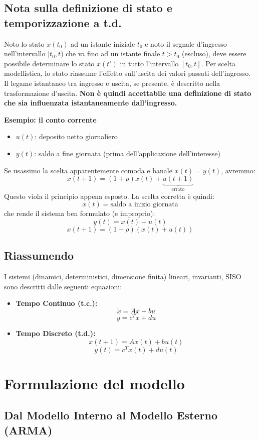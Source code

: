 \documentclass[11pt,a4paper]{article}
\begin{document}
\subsection{Nota sulla definizione di stato e temporizzazione a t.d.}
Noto lo stato $x(t_0)$ ad un istante iniziale $t_0$ e noto il segnale d'ingresso nell'intervallo $[t_0, t)$ che va fino ad un istante finale $t > t_0$ (escluso), deve essere possibile determinare lo stato $x(t')$ in tutto l'intervallo $[t_0, t]$.
Per scelta modellistica, lo stato riassume l'effetto sull'uscita dei valori passati dell'ingresso. Il legame istantaneo tra ingresso e uscita, se presente, è descritto nella trasformazione d'uscita.
\textbf{Non è quindi accettabile una definizione di stato che sia influenzata istantaneamente dall'ingresso.}

\textbf{Esempio: il conto corrente}
\begin{itemize}
    \item $u(t)$: deposito netto giornaliero
    \item $y(t)$: saldo a fine giornata (prima dell'applicazione dell'interesse)
\end{itemize}
Se usassimo la scelta apparentemente comoda e banale $x(t) = y(t)$, avremmo:
$$ x(t+1) = (1+\rho)x(t) + \underbrace{u(t+1)}_{\text{errato}} $$
Questo vìola il principio appena esposto. La scelta corretta è quindi:
$$ x(t) = \text{saldo a inizio giornata} $$
che rende il sistema ben formulato (e improprio):
$$ y(t) = x(t) + u(t) $$
$$ x(t+1) = (1+\rho)(x(t) + u(t)) $$

\subsection{Riassumendo}
I sistemi (dinamici, deterministici, dimensione finita) lineari, invarianti, SISO sono descritti dalle seguenti equazioni:
\begin{itemize}
    \item \textbf{Tempo Continuo (t.c.):}
    $$ \dot{x} = Ax + bu $$
    $$ y = c^T x + du $$
    \item \textbf{Tempo Discreto (t.d.):}
    $$ x(t+1) = Ax(t) + bu(t) $$
    $$ y(t) = c^T x(t) + du(t) $$
\end{itemize}

\section{Formulazione del modello}

\subsection{Dal Modello Interno al Modello Esterno (ARMA)}
\end{document}

